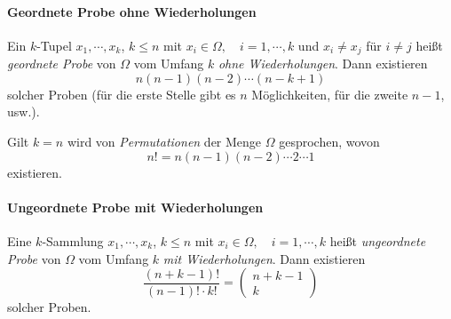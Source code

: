                 \paragraph{Geordnete Probe ohne Wiederholungen}
                    Ein \(k\)-Tupel \( x_1, \cdots, x_k \), \( k \leq n \) mit \( x_i \in \Omega, \quad i = 1, \cdots, k \) und \( x_i \neq x_j \) für \( i \neq j \) heißt \textit{geordnete Probe} von \(\Omega\) vom Umfang \(k\) \textit{ohne Wiederholungen}. Dann existieren
                    \begin{equation*}
                        n(n - 1)(n - 2) \cdots (n - k + 1)
                    \end{equation*}
                    solcher Proben (für die erste Stelle gibt es \(n\) Möglichkeiten, für die zweite \(n - 1\), usw.).
                    
                    Gilt \(k = n\) wird von \textit{Permutationen} der Menge \(\Omega\) gesprochen, wovon
                    \begin{equation*}
                        n! = n(n - 1)(n - 2) \cdots 2 \cdots 1
                    \end{equation*}
                    existieren.

                \paragraph{Ungeordnete Probe mit Wiederholungen}
                    Eine \(k\)-Sammlung \( x_1, \cdots, x_k \), \( k \leq n \) mit \( x_i \in \Omega, \quad i = 1, \cdots, k \) heißt \textit{ungeordnete Probe} von \(\Omega\) vom Umfang \(k\) \textit{mit Wiederholungen}. Dann existieren
                    \begin{equation*}
                        \frac{(n + k - 1)!}{(n - 1)! \cdot k!} =
                        \begin{pmatrix}
	                        n + k - 1 \\
	                        k
                        \end{pmatrix}
                    \end{equation*}
                    solcher Proben.

